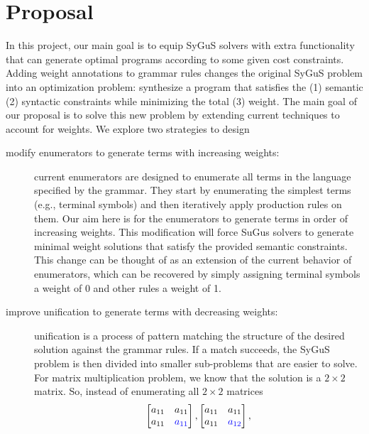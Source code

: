\section{Proposal}
\label{sec:proposal}
In this project, our main goal is to equip SyGuS solvers with extra functionality that can generate optimal programs according to some given cost constraints.
%
Adding weight annotations to grammar rules changes the original SyGuS problem into an optimization problem:
%
synthesize a program that satisfies the (1) semantic (2) syntactic constraints while minimizing the total (3) weight.
%
The main goal of our proposal is to solve this new problem by extending current techniques to account for weights.
%
We explore two strategies to design
%
\begin{description}
\item[modify enumerators to generate terms with increasing weights:]
%
current enumerators are designed to enumerate all terms in the language specified by the grammar.
%
They start by enumerating the simplest terms (e.g., terminal symbols) and then iteratively apply production rules on them.
%
Our aim here is for the enumerators to generate terms in order of increasing weights.
%
This modification will force SuGus solvers to generate minimal weight solutions 
%
that satisfy the provided semantic constraints.
%
%
This change can be thought of as an extension of the current behavior of enumerators, 
%
which can be recovered by simply assigning terminal symbols a weight of 0 and other rules a weight of 1.
%
\item[improve unification to generate terms with decreasing weights:]
%
unification is a process of pattern matching the structure of the desired solution against the grammar rules.
%
If a match succeeds, the SyGuS problem is then divided into smaller sub-problems that are easier to solve.
%
For matrix multiplication problem, we know that the solution is a $2 \times 2$ matrix. So, instead of enumerating all $2 \times 2$ matrices
%
\begin{equation}
\begin{bmatrix} a_{11} & a_{11} \\ a_{11} & \textcolor{blue}{a_{11}} \end{bmatrix},
\begin{bmatrix} a_{11} & a_{11} \\ a_{11} & \textcolor{blue}{a_{12}} \end{bmatrix},

\end{equation}
\end{description}
